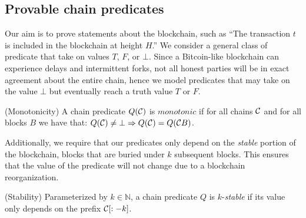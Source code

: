\subsection{Provable chain predicates}

Our aim is to prove statements about the blockchain, such as ``The transaction $t$ is included in the blockchain at height $H$.'' We consider a general class of predicate that take on values $T$, $F$, or $\bot$.
  Since a Bitcoin-like blockchain can experience delays and intermittent forks, not all honest parties will be in exact agreement about the entire chain, hence we model predicates that may take on the value $\bot$ but eventually reach a truth value $T$ or $F$.

\begin{definition}{(Monotonicity)}
    A chain predicate $Q(\mathcal{C})$ is $\textit{monotonic}$ if for all chains
    $\mathcal{C}$ and for all blocks $B$ we have that:
    $Q(\mathcal{C}) \neq \bot \Rightarrow Q(\mathcal{C}) = Q(\mathcal{C} B)$.
\end{definition}

Additionally, we require that our predicates only depend on the \emph{stable}
portion of the blockchain, blocks that are buried under $k$ subsequent blocks.
This ensures that the value of the predicate will not change due to a blockchain
reorganization.

\begin{definition}{(Stability)}
    Parameterized by $k \in \mathbb{N}$, a chain predicate $Q$ is
    $k$-\emph{stable} if its value only depends on the prefix $\mathcal{C}[:-k]$.
\end{definition}
%

